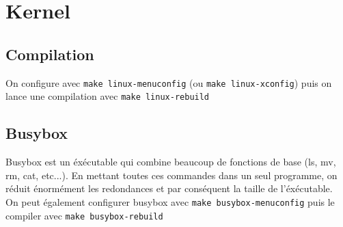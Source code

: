 \documentclass[resume]{subfiles}
\begin{document}
\section{Kernel}
\subsection{Compilation}
On configure avec \verb!make linux-menuconfig! (ou \verb!make linux-xconfig!) puis on lance une compilation avec \verb!make linux-rebuild!
\subsection{Busybox}
Busybox est un éxécutable qui combine beaucoup de fonctions de base (ls, mv, rm, cat, etc...). En mettant toutes ces commandes dans un seul programme, on réduit énormément les redondances et par conséquent la taille de l'éxécutable.\\
On peut également configurer busybox avec \verb!make busybox-menuconfig! puis le compiler avec \verb!make busybox-rebuild!
\end{document}
